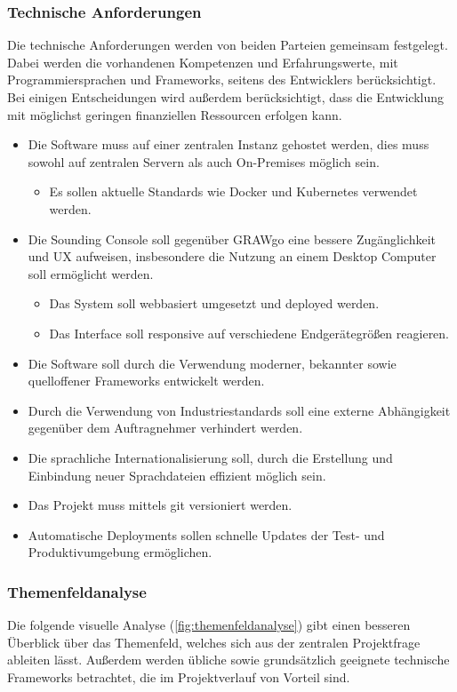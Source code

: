 \subsubsection{Technische Anforderungen}
Die technische Anforderungen werden von beiden Parteien gemeinsam festgelegt.
Dabei werden die vorhandenen Kompetenzen und Erfahrungswerte, mit Programmiersprachen und Frameworks, seitens des Entwicklers berücksichtigt.
Bei einigen Entscheidungen wird außerdem berücksichtigt, dass die Entwicklung mit möglichst geringen finanziellen Ressourcen erfolgen kann.
\begin{itemize}
    \item Die Software muss auf einer zentralen Instanz gehostet werden, dies muss sowohl auf zentralen Servern als auch On-Premises möglich sein.
    \begin{itemize}
        \item Es sollen aktuelle Standards wie Docker und Kubernetes verwendet werden.
    \end{itemize}
    \item Die Sounding Console soll gegenüber GRAWgo eine bessere Zugänglichkeit und UX aufweisen, insbesondere die Nutzung an einem Desktop Computer soll ermöglicht werden.
    \begin{itemize}
        \item Das System soll webbasiert umgesetzt und deployed werden.
        \item Das Interface soll responsive auf verschiedene Endgerätegrößen reagieren.
    \end{itemize}
    \item Die Software soll durch die Verwendung moderner, bekannter sowie quelloffener Frameworks entwickelt werden.
    \item Durch die Verwendung von Industriestandards soll eine externe Abhängigkeit gegenüber dem Auftragnehmer verhindert werden.
    \item Die sprachliche Internationalisierung soll, durch die Erstellung und Einbindung neuer Sprachdateien effizient möglich sein.
    \item Das Projekt muss mittels git versioniert werden.
    \item Automatische Deployments sollen schnelle Updates der Test- und Produktivumgebung ermöglichen.
\end{itemize}
\newpage

\subsubsection{Themenfeldanalyse}
Die folgende visuelle Analyse (\ref{fig:themenfeldanalyse}) gibt einen besseren Überblick über das Themenfeld, welches sich aus der zentralen Projektfrage ableiten lässt.
Außerdem werden übliche sowie grundsätzlich geeignete technische Frameworks betrachtet, die im Projektverlauf von Vorteil sind.

